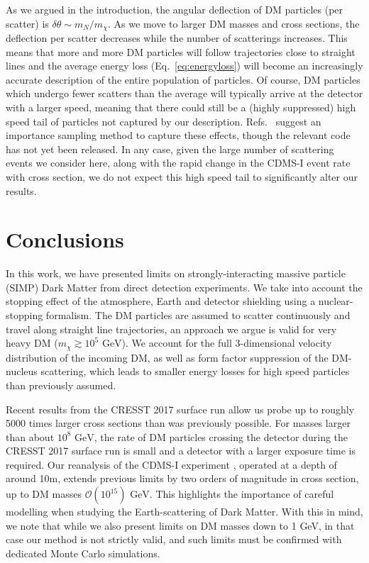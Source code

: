 \documentclass[prd,twocolumn,showpacs,nofootinbib,aps]{revtex4-1}
\begin{document}
As we argued in the introduction, the  angular deflection of DM particles (per scatter) is $\delta \theta \sim m_N/m_\chi$. As we move to larger DM masses and cross sections, the deflection per scatter decreases while the number of scatterings increases. This means that more and more DM particles will follow trajectories close to straight lines and the average energy loss (Eq.~\eqref{eq:energyloss}) will become an increasingly accurate description of the entire population of particles. Of course, DM particles which undergo fewer scatters than the average will typically arrive at the detector with a larger speed, meaning that there could still be a (highly suppressed) high speed tail of particles not captured by our description. Refs.~\cite{Mahdawi:2017cxz,Mahdawi:2017utm} suggest an importance sampling method to capture these effects, though the relevant code has not yet been released. In any case, given the large number of scattering events we consider here, along with the rapid change in the CDMS-I event rate with cross section, we do not expect this high speed tail to significantly alter our results.

\section{Conclusions}

In this work, we have presented limits on strongly-interacting massive particle (SIMP) Dark Matter from direct detection experiments. We take into account the stopping effect of the atmosphere, Earth and detector shielding using a nuclear-stopping formalism. The DM particles are assumed to scatter continuously and travel along straight line trajectories, an approach we argue is valid for very heavy DM ($m_\chi \gtrsim 10^5 \,\,\mathrm{GeV}$). We account for the full 3-dimensional velocity distribution of the incoming DM, as well as form factor suppression of the DM-nucleus scattering, which leads to smaller energy losses for high speed particles than previously assumed. 

Recent results from the CRESST 2017 surface run \cite{Angloher:2017sxg} allow us probe up to roughly 5000 times larger cross sections than was previously possible. For masses larger than about $10^{8}\,\,\mathrm{GeV}$, the rate of DM particles crossing the detector during the CRESST 2017 surface run is small and a detector with a larger exposure time is required. Our reanalysis of the CDMS-I experiment \cite{Abusaidi:2000wg,Abrams:2002nb}, operated at a depth of around 10m, extends previous limits \cite{Albuquerque:2003ei} by two orders of magnitude in cross section, up to DM masses $\mathcal{O}(10^{15})\,\,\mathrm{GeV}$. This highlights the importance of careful modelling when studying the Earth-scattering of Dark Matter. With this in mind, we note that while we also present limits on DM masses down to 1 GeV, in that case our method is not strictly valid, and such limits must be confirmed with dedicated Monte Carlo simulations. 
\end{document}
